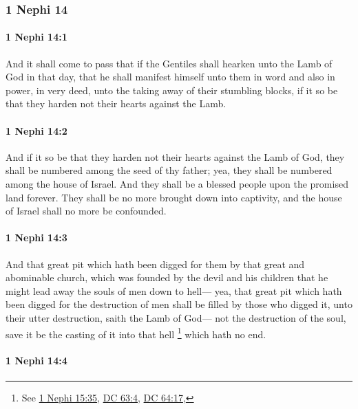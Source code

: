 	\subsubsection{1 Nephi 14} %
		\label{1NEPHI-14}
		
		\paragraph{1 Nephi 14:1} %
			\label{1NEPHI-14-1}

			And it shall come to pass that
			if the Gentiles shall hearken unto the Lamb of God in that day,
			that he shall manifest himself unto them in word and also in power, in very deed,
			unto the taking away of their stumbling blocks,
			if it so be that they harden not their hearts against the Lamb.

		\paragraph{1 Nephi 14:2} %
			\label{1NEPHI-14-2}

			And if it so be that they harden not their hearts against the Lamb of God,
			they shall be numbered among the seed of thy father;
			yea, they shall be numbered among the house of Israel.
			And they shall be a blessed people upon the promised land forever.
			They shall be no more brought down into captivity,
			and the house of Israel shall no more be confounded.

		\paragraph{1 Nephi 14:3} %
			\label{1NEPHI-14-3}

			And that great pit which hath been digged for them
			by that great and abominable church,
			which was founded by the devil and his children
			that he might lead away the souls of men down to hell---
			yea, that great pit which hath been digged for the destruction of men
			shall be filled by those who digged it,
			unto their utter destruction, saith the Lamb of God---
			not the destruction of the soul,
			save it be the casting of it into that hell%
				\footnote{%
					See \hyperref[1NEPHI-15-35]{1 Nephi 15:35}, \hyperref[DC63-4]{DC 63:4}, \hyperref[DC64-17]{DC 64:17}, 
					}
			which hath no end.

		\paragraph{1 Nephi 14:4} %
			\label{1NEPHI-14-4}

